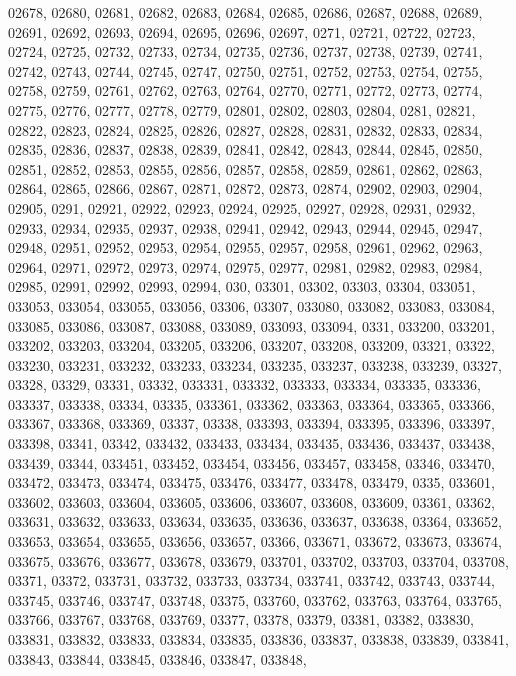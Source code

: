 {02678,
02680,
02681,
02682,
02683,
02684,
02685,
02686,
02687,
02688,
02689,
02691,
02692,
02693,
02694,
02695,
02696,
02697,
0271,
02721,
02722,
02723,
02724,
02725,
02732,
02733,
02734,
02735,
02736,
02737,
02738,
02739,
02741,
02742,
02743,
02744,
02745,
02747,
02750,
02751,
02752,
02753,
02754,
02755,
02758,
02759,
02761,
02762,
02763,
02764,
02770,
02771,
02772,
02773,
02774,
02775,
02776,
02777,
02778,
02779,
02801,
02802,
02803,
02804,
0281,
02821,
02822,
02823,
02824,
02825,
02826,
02827,
02828,
02831,
02832,
02833,
02834,
02835,
02836,
02837,
02838,
02839,
02841,
02842,
02843,
02844,
02845,
02850,
02851,
02852,
02853,
02855,
02856,
02857,
02858,
02859,
02861,
02862,
02863,
02864,
02865,
02866,
02867,
02871,
02872,
02873,
02874,
02902,
02903,
02904,
02905,
0291,
02921,
02922,
02923,
02924,
02925,
02927,
02928,
02931,
02932,
02933,
02934,
02935,
02937,
02938,
02941,
02942,
02943,
02944,
02945,
02947,
02948,
02951,
02952,
02953,
02954,
02955,
02957,
02958,
02961,
02962,
02963,
02964,
02971,
02972,
02973,
02974,
02975,
02977,
02981,
02982,
02983,
02984,
02985,
02991,
02992,
02993,
02994,
030,
03301,
03302,
03303,
03304,
033051,
033053,
033054,
033055,
033056,
03306,
03307,
033080,
033082,
033083,
033084,
033085,
033086,
033087,
033088,
033089,
033093,
033094,
0331,
033200,
033201,
033202,
033203,
033204,
033205,
033206,
033207,
033208,
033209,
03321,
03322,
033230,
033231,
033232,
033233,
033234,
033235,
033237,
033238,
033239,
03327,
03328,
03329,
03331,
03332,
033331,
033332,
033333,
033334,
033335,
033336,
033337,
033338,
03334,
03335,
033361,
033362,
033363,
033364,
033365,
033366,
033367,
033368,
033369,
03337,
03338,
033393,
033394,
033395,
033396,
033397,
033398,
03341,
03342,
033432,
033433,
033434,
033435,
033436,
033437,
033438,
033439,
03344,
033451,
033452,
033454,
033456,
033457,
033458,
03346,
033470,
033472,
033473,
033474,
033475,
033476,
033477,
033478,
033479,
0335,
033601,
033602,
033603,
033604,
033605,
033606,
033607,
033608,
033609,
03361,
03362,
033631,
033632,
033633,
033634,
033635,
033636,
033637,
033638,
03364,
033652,
033653,
033654,
033655,
033656,
033657,
03366,
033671,
033672,
033673,
033674,
033675,
033676,
033677,
033678,
033679,
033701,
033702,
033703,
033704,
033708,
03371,
03372,
033731,
033732,
033733,
033734,
033741,
033742,
033743,
033744,
033745,
033746,
033747,
033748,
03375,
033760,
033762,
033763,
033764,
033765,
033766,
033767,
033768,
033769,
03377,
03378,
03379,
03381,
03382,
033830,
033831,
033832,
033833,
033834,
033835,
033836,
033837,
033838,
033839,
033841,
033843,
033844,
033845,
033846,
033847,
033848,
}
